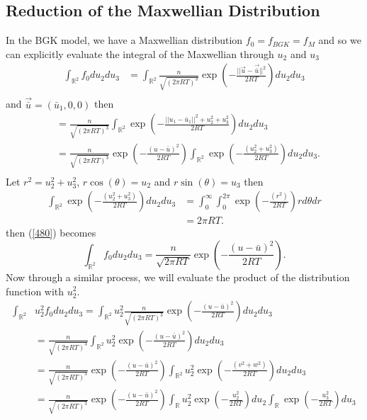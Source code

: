 \subsection{Reduction of the Maxwellian Distribution}
In the BGK model, we have a Maxwellian distribution $f_0 = f_{BGK} = f_M$ and so we can explicitly evaluate the integral of the Maxwellian through $u_2$ and $u_3$
%
\begin{align}
\label{480}
\int_{\mathbb{R}^2} f_0 du_2 du_3 &= \int_{\mathbb{R}^2} \frac{n}{\sqrt{(2 \pi RT)^3}}  \exp{\left(-\frac{||\vec{u} - \vec{\bar{u}}||^2}{2 RT}\right)} du_2 du_3\\
\end{align}
%
and $\vec{\bar{u}} = (\bar{u}_1,0,0)$ then
%
\begin{align*}
&= \frac{n}{\sqrt{(2 \pi RT)^3}} \int_{\mathbb{R}^2}  \exp{\left(-\frac{||u_1 - \bar{u}_1||^2 + u_2^2 + u_3^2}{2 RT}\right)} du_2 du_3\\
&= \frac{n}{\sqrt{(2 \pi RT)^3}}  \exp{\left(-\frac{(u - \bar{u})^2}{2 RT}\right)} \int_{\mathbb{R}^2}  \exp{\left(-\frac{(u_2^2 + u_3^2)}{2 RT}\right)} du_2 du_3.\\
\end{align*}
%
Let $r^2 = u_2^2 + u_3^2$, $r \cos(\theta) = u_2$ and $r \sin(\theta) = u_3$ then
%
\begin{align*}
\int_{\mathbb{R}^2}  \exp{\left(-\frac{(u_2^2 + u_3^2)}{2 RT}\right)} du_2 du_3 &= \int_0^\infty \int_0^{2 \pi}  \exp{\left(-\frac{(r^2)}{2 RT}\right)} r d\theta dr\\
&= 2 \pi RT.
\end{align*}
%
then (\ref{480}) becomes
%
\begin{equation*}
\int_{\mathbb{R}^2} f_0 du_2 du_3 = \frac{n}{\sqrt{2 \pi RT}}  \exp{\left(-\frac{(u - \bar{u})^2}{2 RT}\right)}.
\end{equation*}
%
Now through a similar process, we will evaluate the product of the distribution function with $u_2^2$.
%
\begin{align*}
\int_{\mathbb{R}^2}& u_2^2 f_0 du_2 du_3 = \int_{\mathbb{R}^2} u_2^2 \frac{n}{\sqrt{(2 \pi RT)^3}}  \exp{\left(-\frac{(u - \bar{u})^2}{2 RT}\right)} du_2 du_3\\
&= \frac{n}{\sqrt{(2 \pi RT)^3}} \int_{\mathbb{R}^2} u_2^2  \exp{\left(-\frac{(u - \bar{u})^2}{2 RT} \right)} du_2 du_3\\
&= \frac{n}{\sqrt{(2 \pi RT)^3}}  \exp{\left(-\frac{(u - \bar{u})^2}{2 RT}\right)} \int_{\mathbb{R}^2} u_2^2  \exp{\left(-\frac{(v^2 + w^2)}{2 RT}\right)} du_2 du_3\\
&= \frac{n}{\sqrt{(2 \pi RT)^3}}  \exp{\left(-\frac{(u - \bar{u})^2}{2 RT}\right)} \int_{\mathbb{R}} u_2^2  \exp{\left(-\frac{u_2^2}{2 RT}\right)} du_2 \int_{\mathbb{R}}  \exp{\left(-\frac{u_3^2}{2 RT}\right)} du_3\\
\end{align*}
